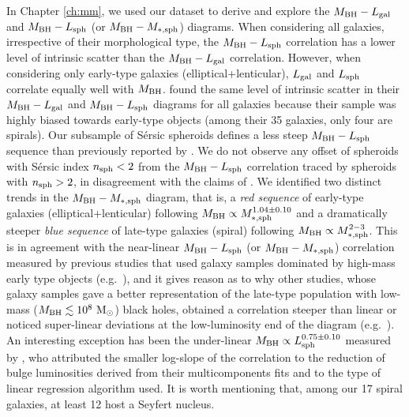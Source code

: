 In Chapter \ref{ch:mm}, we used our dataset to derive and explore 
the $M_{\rm BH} - L_{\rm gal}$ and $M_{\rm BH} - L_{\rm sph}$ (or $M_{\rm BH} - M_{\rm *,sph}$) diagrams. 
When considering all galaxies, irrespective of their morphological type, 
the $M_{\rm BH} - L_{\rm sph}$ correlation has a lower level of intrinsic scatter 
than the $M_{\rm BH} - L_{\rm gal}$ correlation. 
However, when considering only early-type galaxies (elliptical+lenticular), 
$L_{\rm gal}$ and $L_{\rm sph}$ correlate equally well with $M_{\rm BH}$. 
\citet{lasker2014anal} found the same level of intrinsic scatter in their 
$M_{\rm BH} - L_{\rm gal}$ and $M_{\rm BH} - L_{\rm sph}$ diagrams for all galaxies
because their sample was highly biased towards early-type objects 
(among their 35 galaxies, only four are spirals). 
Our subsample of S\'ersic spheroids defines a less steep $M_{\rm BH} - L_{\rm sph}$ 
sequence than previously reported by \citet{grahamscott2013}. 
We do not observe any offset of spheroids with S\'ersic index $n_{\rm sph} < 2$ 
from the $M_{\rm BH} - L_{\rm sph}$ correlation traced by spheroids with $n_{\rm sph} > 2$, 
in disagreement with the claims of \citet{sani2011}. 
We identified two distinct trends in the $M_{\rm BH} - M_{\rm *,sph}$ diagram, 
that is, a \emph{red sequence} of early-type galaxies (elliptical+lenticular) 
following $M_{\rm BH} \propto M_{\rm *,sph}^{1.04 \pm 0.10}$ 
and a dramatically steeper \emph{blue sequence} of late-type galaxies (spiral) 
following $M_{\rm BH} \propto M_{\rm *,sph}^{2-3}$. 
This is in agreement with the near-linear $M_{\rm BH} - L_{\rm sph}$ (or $M_{\rm BH} - M_{\rm *,sph}$) correlation 
measured by previous studies that used galaxy samples dominated by high-mass early type objects 
(e.g.~\citealt{magorrian1998,marconihunt2003,haringrix2004,gultelkin2009,sani2011,beifiori2012,
erwingadotti2012,vika2012}),  
and it gives reason as to why other studies, 
whose galaxy samples gave a better representation of the late-type population 
with low-mass ($M_{\rm BH} \lesssim 10^8 \rm~M_\odot$) black holes, 
obtained a correlation steeper than linear 
or noticed super-linear deviations at the low-luminosity end of the diagram 
(e.g.~\citealt{laor1998,laor2001,wandel1999,salucci2000,ryan2007}). 
An interesting exception has been the under-linear $M_{\rm BH} \propto L_{\rm sph}^{0.75 \pm 0.10}$ 
measured by \citet{lasker2014anal}, 
who attributed the smaller log-slope of the correlation 
to the reduction of bulge luminosities derived from their multicomponents fits 
and to the type of linear regression algorithm used. 
It is worth mentioning that, among our 17 spiral galaxies, at least 12 host a Seyfert nucleus. 

